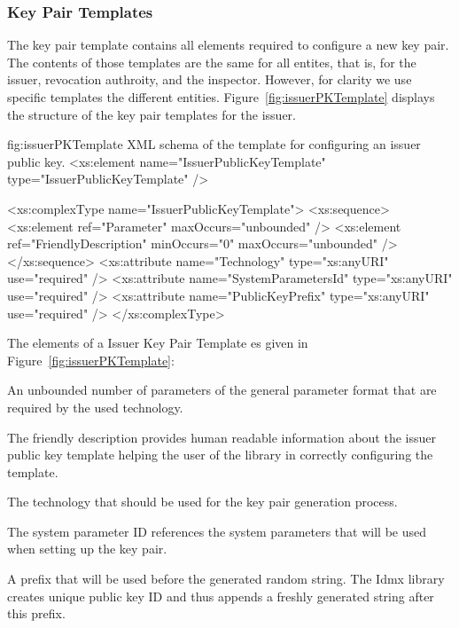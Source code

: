 \subsubsection{Key Pair Templates}

The key pair template contains all elements required to configure a new key pair.
%
The contents of those templates are the same for all entites, that is, for the issuer, revocation authroity, and the
inspector.
However, for clarity we use specific templates the different entities.
%
Figure~\ref{fig:issuerPKTemplate}%
displays the structure 
of the key pair templates for the issuer.


\begin{xml}
{fig:issuerPKTemplate}
{XML schema of the template for configuring an issuer public key.}
<xs:element name="IssuerPublicKeyTemplate" type="IssuerPublicKeyTemplate" />

<xs:complexType name="IssuerPublicKeyTemplate">
  <xs:sequence>
    <xs:element ref="Parameter" maxOccurs="unbounded" />
    <xs:element ref="FriendlyDescription" minOccurs="0"
      maxOccurs="unbounded" />
  </xs:sequence>
  <xs:attribute name="Technology" type="xs:anyURI" use="required" />
  <xs:attribute name="SystemParametersId" type="xs:anyURI" use="required" />
  <xs:attribute name="PublicKeyPrefix" type="xs:anyURI" use="required" />
</xs:complexType>
\end{xml}

\vspace{3pt}\noindent The elements of a Issuer Key Pair Template es given in Figure~\ref{fig:issuerPKTemplate}:
\begin{parameter}
An unbounded number of parameters of the general parameter format that are required by the
used technology.
\end{parameter}
\begin{parameter}
The friendly description provides human readable information about the issuer public key template
helping the user of the library in correctly configuring the template.
\end{parameter}
\begin{parameter}
The technology that should be used for the key pair generation process.
\end{parameter}
\begin{parameter}
The system parameter ID references the system parameters that will be used when setting up the key pair.
\end{parameter}
\begin{parameter}
A prefix that will be used before the generated random string. The Idmx library creates unique public key
ID and thus appends a freshly generated string after this prefix.
\end{parameter}



